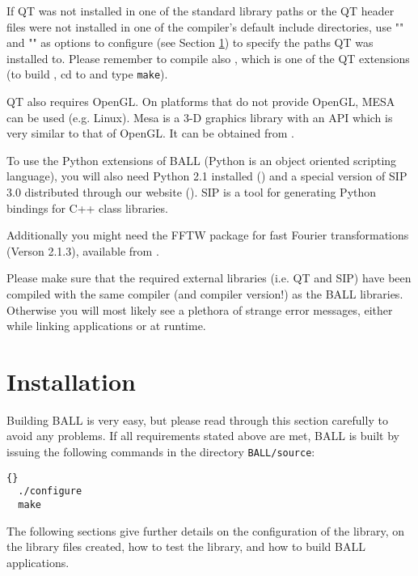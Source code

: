 If QT was not installed in one of the standard library paths or the
QT header files were not installed in one of the compiler's default
include directories, use \mbox{""} and
\mbox{""} as options to configure (see
Section \ref{section:building-ball}) to specify the paths QT was installed
to.
Please remember to compile also , which is one of the QT
extensions (to build , cd to 
{\tt{}} and type {\tt make}).

QT also requires OpenGL. On platforms that do not provide OpenGL, MESA can
be used (e.g. Linux). Mesa is a 3-D graphics library with an API which is 
very similar to that of OpenGL. It can be obtained from 
.

To use the Python extensions of BALL (Python is an object oriented
scripting language), you will also need Python 2.1 installed
() and a special version of SIP 3.0 distributed
through our website (). SIP is a tool
for generating Python bindings for C++ class libraries.

Additionally you might need the FFTW package for fast Fourier
transformations (Verson 2.1.3), available from .

Please make sure that the required external \CPP libraries (i.e. QT and SIP)
have been compiled with the same compiler (and compiler version!) as the BALL
libraries. Otherwise you will most likely see a plethora of strange error
messages, either while linking applications or at runtime.

\section{Installation}
\label{section:building-ball}

Building BALL is very easy, but please read through this section carefully to
avoid any problems.  If all requirements stated above are met, BALL is built
by issuing the following commands in the directory {\tt BALL/source}:

\begin{lstlisting}{}
  ./configure
  make
\end{lstlisting}

The following sections give further details on the configuration of the library,
on the library files created, how to test the library, and how to build BALL 
applications.

